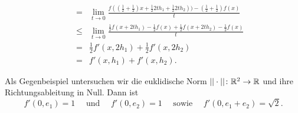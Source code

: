 \begin{compactenum}[(i)]
\begin{align*}
  &&=&\lim_{t\to 0} \frac{f((\frac{1}{2}+\frac{1}{2})x+\frac{1}{2} 2th_1+\frac{1}{2}2th_2))-(\frac{1}{2}+\frac{1}{2})f(x)}{t}\\
  &&\leq& \lim_{t\to 0} \frac{\frac{1}{2}f(x+2th_1)-\frac{1}{2}f(x)+\frac{1}{2}f(x+ 2th_2)-\frac{1}{2}f(x)}{t}\\
  &&=& \frac{1}{2} f'(x,2h_1)+\frac{1}{2} f'(x,2h_2)\\
  &&=& f'(x,h_1)+f'(x,h_2).
 \end{align*}
 \item Als Gegenbeispiel untersuchen wir die euklidische Norm $||\cdot||\colon \mathbb{R}^2\to\mathbb{R}$ und ihre Richtungsableitung in Null. Dann ist
 \begin{displaymath}
  f'(0,e_1)=1 \quad\text{ und }\quad f'(0,e_2)=1 \quad \text{ sowie }\quad f'(0, e_1+e_2)=\sqrt{2}.
 \end{displaymath}
\end{compactenum}


